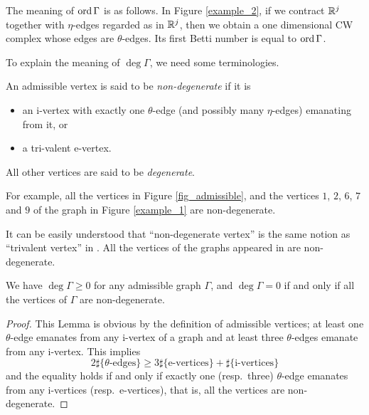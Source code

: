 The meaning of $\mathrm{ord}\, \Gamma$ is as follows.
In Figure \ref{example_2}, if we contract $\mathbb{R}^j$ together with $\eta$-edges regarded as in $\mathbb{R}^j$, then we obtain a
one dimensional CW complex whose edges are $\theta$-edges. Its first Betti number is equal to $\mathrm{ord}\, \Gamma$.


To explain the meaning of $\deg \Gamma$, we need some terminologies.



\begin{defn}\label{non_degenerte_graphs}
An admissible vertex is said to be {\it non-degenerate} if it is
\begin{itemize}
\item an i-vertex with exactly one $\theta$-edge (and possibly many $\eta$-edges) emanating from it, or
\item a tri-valent e-vertex.
\end{itemize}
All other vertices are said to be {\it degenerate}.
\end{defn}



For example, all the vertices in Figure \ref{fig_admissible}, and the vertices $1$, $2$, $6$, $7$ and $9$ of the graph
in Figure \ref{example_1} are non-degenerate.


\begin{rem}
It can be easily understood that ``non-degenerate vertex'' is the same notion as ``trivalent vertex'' in \cite{CCL02}.
All the vertices of the graphs appeared in \cite{CattaneoRossi05, Rossi_thesis, Watanabe07} are non-degenerate.
\end{rem}


\begin{lem}
We have $\deg \Gamma \ge 0$ for any admissible graph $\Gamma$, and $\deg \Gamma =0$ if and only if all the vertices
of $\Gamma$ are non-degenerate.
\end{lem}



\begin{proof}
This Lemma is obvious by the definition of admissible vertices;
at least one $\theta$-edge emanates from any i-vertex of a graph and at least three $\theta$-edges emanate from
any i-vertex.
This implies
\[
 2 \sharp \{ \theta \text{-edges}\} \ge 3 \sharp \{ \text{e-vertices}\} + \sharp \{ \text{i-vertices}\}
\]
and the equality holds if and only if exactly one (resp.\ three) $\theta$-edge emanates from any i-vertices
(resp.\ e-vertices), that is, all the vertices are non-degenerate.
\end{proof}



